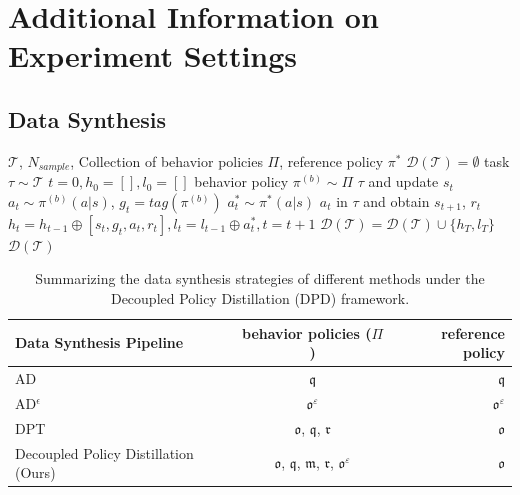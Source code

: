 \documentclass{article}
\renewcommand{\cite}[1]{\citep{#1}}
\begin{document}
\section{Additional Information on Experiment Settings}
\subsection{Data Synthesis} \label{sec:anymdp_synthesis}
\begin{algorithm}[htbp]
   \caption{Data Synthesis Pipeline}
   \label{alg:data_synthesis}
    \begin{algorithmic}
        $\mathcal{T}$, $N_{sample}$, Collection of behavior policies $\Pi$, reference policy $\pi^{*}$
        $\mathcal{D}(\mathcal{T})=\emptyset$
       \FOR{$[1,N_{sample}]$}
             task $\tau \sim \mathcal{T}$
             $t=0, h_0=[], l_0=[]$
            \REPEAT
                 behavior policy $\pi^{(b)} \sim \Pi$
                 $\tau$ and update $s_t$
                \REPEAT
                      $a_t \sim \pi^{(b)}(a|s)$, $g_t=tag(\pi^{(b)})$
                     $a^*_t \sim \pi^*(a|s)$
                     $a_t$ in $\tau$ and obtain $s_{t+1}$, $r_t$
                     $h_{t}=h_{t-1}\oplus[s_t, g_t, a_t, r_t], l_{t} = l_{t-1}\oplus a^*_t, t=t+1$
             $\mathcal{D}(\mathcal{T})=\mathcal{D}(\mathcal{T}) \cup \{h_T, l_T\}$
       \ENDFOR
         $\mathcal{D}(\mathcal{T})$
    \end{algorithmic}
\end{algorithm}
\begin{table}[t]
\caption{Summarizing the data synthesis strategies of different methods under the Decoupled Policy Distillation (DPD) framework.}
\label{table:icrl_data_synthesis}
\vskip 0.15in
\begin{center}
\begin{small}
\begin{sc}
\begin{tabular}{lcr}
\toprule
Data Synthesis Pipeline & behavior policies ($\Pi$) & reference policy \\
\midrule
AD \cite{laskin2022context}    &  $\mathfrak{q}$ & $\mathfrak{q}$ \\
AD$^{\epsilon}$ \cite{zisman2023emergence}    & $\mathfrak{o}^{\varepsilon}$ & $\mathfrak{o}^{\varepsilon}$ \\
DPT \cite{lee2024supervised} & $\mathfrak{o}$, $\mathfrak{q}$, $\mathfrak{r}$ & $\mathfrak{o}$ \\
Decoupled Policy Distillation (Ours) & $\mathfrak{o}$, $\mathfrak{q}$, $\mathfrak{m}$, $\mathfrak{r}$, $\mathfrak{o}^{\varepsilon}$ & $\mathfrak{o}$ \\
\bottomrule
\end{tabular}
\end{sc}
\end{small}
\end{center}
\vskip -0.1in
\end{table}
\end{document}
